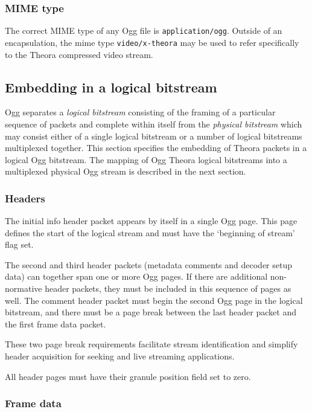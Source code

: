\documentclass[11pt,letterpaper]{article}
\begin{document}
\subsubsection{MIME type}

The correct MIME type of any Ogg file is {\tt application/ogg}.
Outside of an encapsulation, the mime type {\tt video/x-theora} may
 be used to refer specifically to the Theora compressed video stream.

\subsection{Embedding in a logical bitstream}

Ogg separates a {\em logical bitstream} consisting of the framing of
 a particular sequence of packets and complete within itself from
 the {\em physical bitstream} which may consist either of a single
 logical bitstream or a number of logical bitstreams multiplexed
 together.
This section specifies the embedding of Theora packets in a logical Ogg
 bitstream.
The mapping of Ogg Theora logical bitstreams into a multiplexed physical Ogg
 stream is described in the next section.

\subsubsection{Headers}

The initial info header packet appears by itself in a single Ogg page.
This page defines the start of the logical stream and must have
 the `beginning of stream' flag set.

The second and third header packets (metadata comments and decoder
 setup data) can together span one or more Ogg pages.
If there are additional non-normative header packets, they must be
 included in this sequence of pages as well.
The comment header packet must begin the second Ogg page in the logical
 bitstream, and there must be a page break between the last header
 packet and the first frame data packet.

These two page break requirements facilitate stream identification and
 simplify header acquisition for seeking and live streaming applications.

All header pages must have their granule position field set to zero.

\subsubsection{Frame data}
\end{document}
